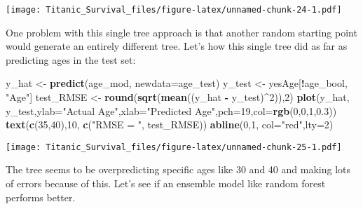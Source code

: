 \documentclass[]{article}
\newenvironment{Shaded}{\begin{snugshade}}{\end{snugshade}}
\newcommand{\KeywordTok}[1]{\textcolor[rgb]{0.13,0.29,0.53}{\textbf{#1}}}
\newcommand{\DataTypeTok}[1]{\textcolor[rgb]{0.13,0.29,0.53}{#1}}
\newcommand{\DecValTok}[1]{\textcolor[rgb]{0.00,0.00,0.81}{#1}}
\newcommand{\FloatTok}[1]{\textcolor[rgb]{0.00,0.00,0.81}{#1}}
\newcommand{\StringTok}[1]{\textcolor[rgb]{0.31,0.60,0.02}{#1}}
\newcommand{\OperatorTok}[1]{\textcolor[rgb]{0.81,0.36,0.00}{\textbf{#1}}}
\newcommand{\NormalTok}[1]{#1}
\begin{document}
\texttt{[image: Titanic\_Survival\_files/figure-latex/unnamed-chunk-24-1.pdf]}

One problem with this single tree approach is that another random
starting point would generate an entirely different tree. Let's how this
single tree did as far as predicting ages in the test set:

\begin{Shaded}
\begin{Highlighting}[]
\NormalTok{y_hat <-}\StringTok{ }\KeywordTok{predict}\NormalTok{(age_mod, }\DataTypeTok{newdata=}\NormalTok{age_test)}
\NormalTok{y_test <-}\StringTok{ }\NormalTok{yesAge[}\OperatorTok{!}\NormalTok{age_bool, }\StringTok{"Age"}\NormalTok{]}
\NormalTok{test_RMSE <-}\StringTok{ }\KeywordTok{round}\NormalTok{(}\KeywordTok{sqrt}\NormalTok{(}\KeywordTok{mean}\NormalTok{((y_hat }\OperatorTok{-}\StringTok{ }\NormalTok{y_test)}\OperatorTok{^}\DecValTok{2}\NormalTok{)),}\DecValTok{2}\NormalTok{)}
\KeywordTok{plot}\NormalTok{(y_hat, y_test,}\DataTypeTok{ylab=}\StringTok{"Actual Age"}\NormalTok{,}\DataTypeTok{xlab=}\StringTok{"Predicted Age"}\NormalTok{,}\DataTypeTok{pch=}\DecValTok{19}\NormalTok{,}\DataTypeTok{col=}\KeywordTok{rgb}\NormalTok{(}\DecValTok{0}\NormalTok{,}\DecValTok{0}\NormalTok{,}\DecValTok{1}\NormalTok{,}\FloatTok{0.3}\NormalTok{))}
\KeywordTok{text}\NormalTok{(}\KeywordTok{c}\NormalTok{(}\DecValTok{35}\NormalTok{,}\DecValTok{40}\NormalTok{),}\DecValTok{10}\NormalTok{, }\KeywordTok{c}\NormalTok{(}\StringTok{"RMSE = "}\NormalTok{, test_RMSE))}
\KeywordTok{abline}\NormalTok{(}\DecValTok{0}\NormalTok{,}\DecValTok{1}\NormalTok{, }\DataTypeTok{col=}\StringTok{"red"}\NormalTok{,}\DataTypeTok{lty=}\DecValTok{2}\NormalTok{)}
\end{Highlighting}
\end{Shaded}

\texttt{[image: Titanic\_Survival\_files/figure-latex/unnamed-chunk-25-1.pdf]}

The tree seems to be overpredicting specific ages like 30 and 40 and
making lots of errors because of this. Let's see if an ensemble model
like random forest performs better.
\end{document}

